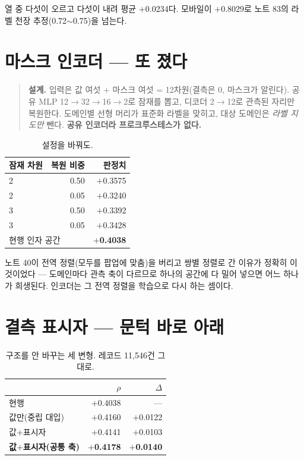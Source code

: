 \documentclass[10pt]{article}
\begin{document}
열 중 다섯이 오르고 다섯이 내려 평균 $+$0.0234다. 모바일이 $+$0.8029로 노트
83의 라벨 천장 추정(0.72$\sim$0.75)을 넘는다.

\section{마스크 인코더 --- 또 졌다}

\begin{quote}\fontsize{9.5}{11.5}\selectfont
\textbf{설계.} 입력은 값 여섯 $+$ 마스크 여섯 = 12차원(결측은 0, 마스크가 알린다).
공유 MLP 12$\to$32$\to$16$\to$2로 잠재를 뽑고, 디코더 2$\to$12로 관측된 자리만
복원한다. 도메인별 선형 머리가 표준화 라벨을 맞히고, 대상 도메인은 \emph{라벨
지도만} 뺀다. \textbf{공유 인코더라 프로크루스테스가 없다.}
\end{quote}

\begin{table}[t]
\centering\tsize
\caption{설정을 바꿔도.}
\begin{tabular}{lrr}
\toprule
잠재 차원 & 복원 비중 & 판정치 \\
\midrule
2 & 0.50 & $+$0.3575 \\
2 & 0.05 & $+$0.3240 \\
3 & 0.50 & $+$0.3392 \\
3 & 0.05 & $+$0.3428 \\
\midrule
\multicolumn{2}{l}{현행 인자 공간} & \textbf{$+$0.4038} \\
\bottomrule
\end{tabular}
\end{table}


노트 40이 전역 정렬(모두를 팝업에 맞춤)을 버리고 쌍별 정렬로 간 이유가 정확히
이것이었다 --- 도메인마다 관측 축이 다르므로 하나의 공간에 다 밀어 넣으면
어느 하나가 희생된다. 인코더는 그 전역 정렬을 학습으로 다시 하는 셈이다.

\section{결측 표시자 --- 문턱 바로 아래}

\begin{table}[t]
\centering\tsize
\caption{구조를 안 바꾸는 세 변형. 레코드 11,546건 그대로.}
\begin{tabular}{lrr}
\toprule
& $\rho$ & $\Delta$ \\
\midrule
현행 & $+$0.4038 & --- \\
값만(중립 대입) & $+$0.4160 & $+$0.0122 \\
값$+$표시자 & $+$0.4141 & $+$0.0103 \\
\textbf{값$+$표시자(공통 축)} & \textbf{$+$0.4178} & \textbf{$+$0.0140} \\
\bottomrule
\end{tabular}
\end{table}
\end{document}
